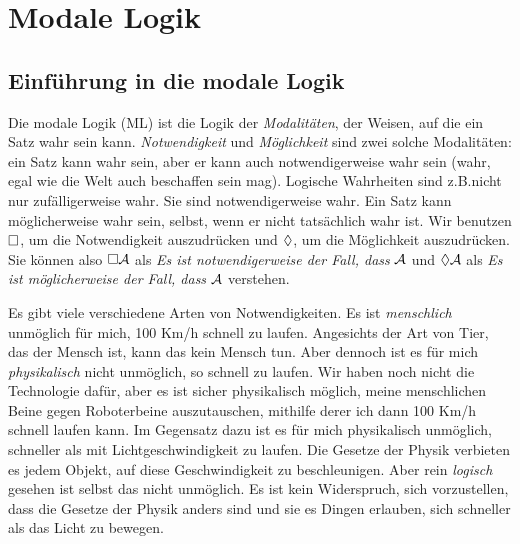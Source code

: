 
\part{Modale Logik}
\label{ch.ML}

\chapter{Einführung in die modale Logik}
\label{Intro}

Die modale Logik (ML) ist die Logik der \emph{Modalitäten}, der Weisen, auf die ein Satz wahr sein kann. \emph{Notwendigkeit} und \emph{Möglichkeit} sind zwei solche Modalitäten: ein Satz kann wahr sein, aber er kann auch notwendigerweise wahr sein (wahr, egal wie die Welt auch beschaffen sein mag). Logische Wahrheiten sind z.B.\@ nicht nur zufälligerweise wahr. Sie sind notwendigerweise wahr. Ein Satz kann möglicherweise wahr sein, selbst, wenn er nicht tatsächlich wahr ist. Wir benutzen $\Box$, um die Notwendigkeit auszudrücken und $\Diamond$, um die Möglichkeit auszudrücken. Sie können also $\Box \mathcal{A}$ als \emph{Es ist notwendigerweise der Fall, dass} $\mathcal{A}$ und $\Diamond \mathcal{A}$ als \emph{Es ist möglicherweise der Fall, dass} $\mathcal{A}$ verstehen.

Es gibt viele verschiedene Arten von Notwendigkeiten. Es ist \emph{menschlich} unmöglich für mich, 100 Km/h schnell zu laufen. Angesichts der Art von Tier, das der Mensch ist, kann das kein Mensch tun. Aber dennoch ist es für mich \emph{physikalisch} nicht unmöglich, so schnell zu laufen. Wir haben noch nicht die Technologie dafür, aber es ist sicher physikalisch möglich, meine menschlichen Beine gegen Roboterbeine auszutauschen, mithilfe derer ich dann 100 Km/h schnell laufen kann. Im Gegensatz dazu ist es für mich physikalisch unmöglich, schneller als mit Lichtgeschwindigkeit zu laufen. Die Gesetze der Physik verbieten es jedem Objekt, auf diese Geschwindigkeit zu beschleunigen. Aber rein \emph{logisch} gesehen ist selbst das nicht unmöglich. Es ist kein Widerspruch, sich vorzustellen, dass die Gesetze der Physik anders sind und sie es Dingen erlauben, sich schneller als das Licht zu bewegen.

